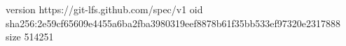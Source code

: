 version https://git-lfs.github.com/spec/v1
oid sha256:2e59cf65609e4455a6ba2fba3980319eef8878b61f35bb533ef97320e2317888
size 514251
